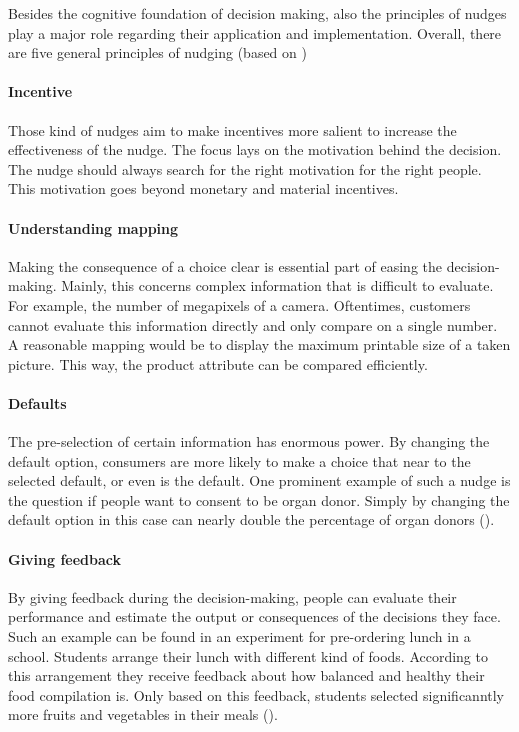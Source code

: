 Besides the cognitive foundation of decision making, also the principles of nudges play a major role regarding their application and implementation. Overall, there are five general principles of nudging (based on \cite{thaler_choice_2010})
\paragraph{Incentive}
Those kind of nudges aim to make incentives more salient to increase the effectiveness of the nudge. The focus lays on the motivation behind the decision. The nudge should always search for the right motivation for the right people. This motivation goes beyond monetary and material incentives.
\paragraph{Understanding mapping}
Making the consequence of a choice clear is essential part of easing the decision-making. Mainly, this concerns complex information that is difficult to evaluate. For example, the number of megapixels of a camera. Oftentimes, customers cannot evaluate this information directly and only compare on a single number. A reasonable mapping would be to display the maximum printable size of a taken picture. This way, the product attribute can be compared efficiently.
\paragraph{Defaults}
The pre-selection of certain information has enormous power. By changing the default option, consumers are more likely to make a choice that near to the selected default, or even is the default. One prominent example of such a nudge is the question if people want to consent to be organ donor. Simply by changing the default option in this case can nearly double the percentage of organ donors (\cite{johnson_defaults_2003}). 
\paragraph{Giving feedback}
By giving feedback during the decision-making, people can evaluate their performance and estimate the output or consequences of the decisions they face. Such an example can be found in an experiment for pre-ordering lunch in a school. Students arrange their lunch with different kind of foods. According to this arrangement they receive feedback about how balanced and healthy their food compilation is. Only based on this feedback, students selected significanntly more fruits and vegetables in their meals (\cite{miller_effects_2016}).
